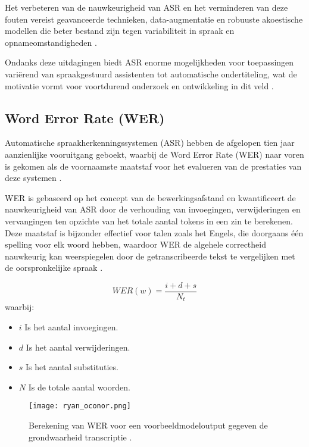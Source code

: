 Het verbeteren van de nauwkeurigheid van ASR en het verminderen van deze fouten vereist geavanceerde technieken, data-augmentatie en robuuste akoestische modellen die beter bestand zijn tegen variabiliteit in spraak en opnameomstandigheden \autocite{Errattahi_2018}.

Ondanks deze uitdagingen biedt ASR enorme mogelijkheden voor toepassingen variërend van spraakgestuurd assistenten tot automatische ondertiteling, wat de motivatie vormt voor voortdurend onderzoek en ontwikkeling in dit veld \autocite{Errattahi_2018}.

\subsection{Word Error Rate (WER)}
Automatische spraakherkenningssystemen (ASR) hebben de afgelopen tien jaar aanzienlijke vooruitgang geboekt, waarbij de Word Error Rate (WER) naar voren is gekomen als de voornaamste maatstaf voor het evalueren van de prestaties van deze systemen \autocite{Raghavan2022}.

WER is gebaseerd op het concept van de bewerkingsafstand en kwantificeert de nauwkeurigheid van ASR door de verhouding van invoegingen, verwijderingen en vervangingen ten opzichte van het totale aantal tokens in een zin te berekenen. Deze maatstaf is bijzonder effectief voor talen zoals het Engels, die doorgaans één spelling voor elk woord hebben, waardoor WER de algehele correctheid nauwkeurig kan weerspiegelen door de getranscribeerde tekst te vergelijken met de oorspronkelijke spraak \autocite{Raghavan2022}.



\begin{equation}
    WER(w) = \frac{i + d + s}{N_t}
\end{equation}
waarbij:
\begin{itemize}
    \item \(i\) Is het aantal invoegingen.
    \item \(d\) Is het aantal verwijderingen.
    \item \(s\) Is het aantal substituties.
    \item \(N\) Is de totale aantal woorden.
\end{itemize}

\begin{figure}[h]
    \centering
    \texttt{[image: ryan\_oconor.png]}
    \captionsetup{justification=centering}
    \caption{Berekening van WER voor een voorbeeldmodeloutput gegeven de grondwaarheid transcriptie \autocite{OConnor2023}.}
    \label{fig:voorbeeld}
\end{figure}


